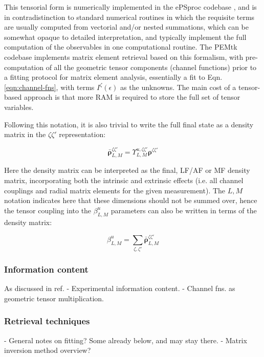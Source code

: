 This tensorial form is numerically implemented in the ePSproc codebase \cite{ePSprocGithub}, and is in contradistinction to standard numerical routines in which the requisite terms are usually computed from vectorial and/or nested summations, which can be somewhat opaque to detailed interpretation, and typically implement the full computation of the observables in one computational routine. The PEMtk codebase \cite{hockett2021PhotoelectronMetrologyToolkit} implements matrix element retrieval based on this formalism, with pre-computation of all the geometric tensor components (channel functions) prior to a fitting protocol for matrix element analysis, essentially a fit to Eqn. \ref{eqn:channel-fns}, with terms $I^{\zeta}(\epsilon)$ as the unknowns. The main cost of a tensor-based approach is that more RAM is required to store the full set of tensor variables.

Following this notation, it is also trivial to write the full final state as a density matrix in the $\zeta\zeta'$ representation:

\begin{equation}
\mathbf{\bar{\rho}}_{L,M}^{\zeta\zeta'}=\varUpsilon_{L,M}^{u,\zeta\zeta'}\mathbf{\rho}^{\zeta\zeta'}
\end{equation}

Here the density matrix can be interpreted as the final, LF/AF or
MF density matrix, incorporating both the intrinsic and extrinsic
effects (i.e. all channel couplings and radial matrix elements for
the given measurement). The $L,M$ notation indicates here that these
dimensions should not be summed over, hence the
tensor coupling into the $\beta_{L,M}^{u}$ parameters can also be written in terms of the density matrix:

\begin{equation}
\beta_{L,M}^{u}=\sum_{\zeta,\zeta'}\mathbf{\bar{\rho}}_{L,M}^{\zeta\zeta'}
\end{equation}

\subsubsection{Information content}










As discussed in ref. \cite{hockett2018QMP2}
- Experimental information content.
- Channel fns. as geometric tensor multiplication.


\subsubsection{Retrieval techniques}

- General notes on fitting? Some already below, and may stay there.
- Matrix inversion method overview?
